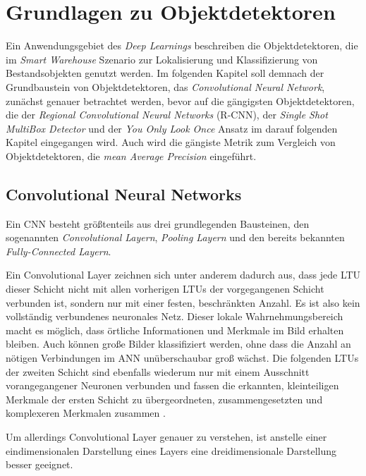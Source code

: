 \section{Grundlagen zu Objektdetektoren} \label{basics}

Ein Anwendungsgebiet des \textit{Deep Learnings} beschreiben die Objektdetektoren, die im \textit{Smart Warehouse} Szenario zur Lokalisierung und Klassifizierung von Bestandsobjekten genutzt werden. Im folgenden Kapitel soll demnach der Grundbaustein von Objektdetektoren, das \textit{Convolutional Neural Network}, zunächst genauer betrachtet werden, bevor auf die gängigsten Objektdetektoren, die der \textit{Regional Convolutional Neural Networks} (R-CNN), der \textit{Single Shot MultiBox Detector} und der \textit{You Only Look Once} Ansatz im darauf folgenden Kapitel eingegangen wird. Auch wird die gängiste Metrik zum Vergleich von Objektdetektoren, die \textit{mean Average Precision} eingeführt.

\subsection*{Convolutional Neural Networks}

Ein CNN besteht größtenteils aus drei grundlegenden Bausteinen, den sogenannten \textit{Convolutional Layern}, \textit{Pooling Layern} und den bereits bekannten \textit{Fully-Connected Layern}.

Ein Convolutional Layer zeichnen sich unter anderem dadurch aus, dass jede LTU dieser Schicht nicht mit allen vorherigen LTUs der vorgegangenen Schicht verbunden ist, sondern nur mit einer festen, beschränkten Anzahl. Es ist also kein vollständig verbundenes neuronales Netz. Dieser \glqq lokale Wahrnehmungsbereich\grqq{} macht es möglich, dass örtliche Informationen und Merkmale im Bild erhalten bleiben. Auch können große Bilder klassifiziert werden, ohne dass die Anzahl an nötigen Verbindungen im ANN unüberschaubar groß wächst. Die folgenden LTUs der zweiten Schicht sind ebenfalls wiederum nur mit einem Ausschnitt vorangegangener Neuronen verbunden und fassen die erkannten, kleinteiligen Merkmale der ersten Schicht zu übergeordneten, zusammengesetzten und komplexeren Merkmalen zusammen \cite{AurelienGeron.2018}.

Um allerdings Convolutional Layer genauer zu verstehen, ist anstelle einer eindimensionalen Darstellung eines Layers eine dreidimensionale Darstellung besser geeignet.


